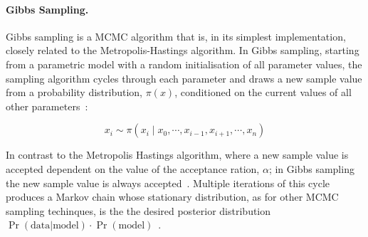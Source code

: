 \paragraph{Gibbs Sampling.}
Gibbs sampling is a MCMC algorithm that is, in its simplest implementation, closely related to the Metropolis-Hastings algorithm. In Gibbs sampling, starting from a parametric model with a random initialisation of all parameter values, the sampling algorithm cycles through each parameter and draws a new sample value from a probability distribution, $\pi(x)$, conditioned on the current values of all other parameters~\cite{Smith1993}:

\begin{equation}
x_i \sim \pi(x_i \mid x_0, \cdots, x_{i-1}, x_{i+1}, \cdots, x_n)
\label{eq:gibbs}
\end{equation}

In contrast to the Metropolis Hastings algorithm, where a new sample value is accepted dependent on the value of the acceptance ration, $\alpha$; in Gibbs sampling the new sample value is always accepted~\cite{Casella1992}. Multiple iterations of this cycle produces a Markov chain whose stationary distribution, as for other MCMC sampling techinques, is the the desired posterior distribution $\Pr(\text{data}|\text{model}) \cdot \Pr(\text{model})$~\cite{gelman1995}.


